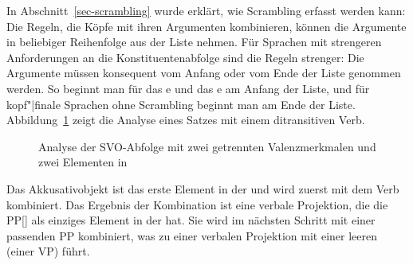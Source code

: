 In Abschnitt~\ref{sec-scrambling} wurde erklärt, wie Scrambling erfasst werden kann: Die Regeln, die
Köpfe mit ihren Argumenten kombinieren, können die Argumente in beliebiger Reihenfolge aus der Liste nehmen. Für Sprachen
mit strengeren Anforderungen an die Konstituentenabfolge sind die Regeln strenger: Die Argumente müssen
konsequent vom Anfang oder vom Ende der Liste genommen werden. So beginnt man für das e und das e
am Anfang der Liste, und für kopf"|finale Sprachen ohne Scrambling beginnt man am Ende
der Liste. Abbildung~\ref{fig-svo-ditrans} zeigt die Analyse eines Satzes mit einem ditransitiven Verb.
\begin{figure}
\caption{\label{fig-svo-ditrans}Analyse der SVO-Abfolge mit zwei getrennten Valenzmerkmalen und zwei
  Elementen in \comps}
\end{figure}
Das Akkusativobjekt ist das erste Element in der \compsl und wird zuerst mit dem Verb
kombiniert. Das Ergebnis der Kombination ist eine verbale Projektion, die die PP[] als einziges
Element in der \compsl hat. Sie wird im nächsten Schritt mit einer passenden PP kombiniert, was zu einer verbalen
Projektion mit einer leeren \compsl (einer VP) führt.

